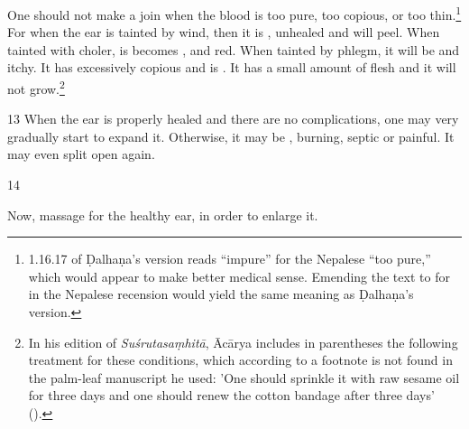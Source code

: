 \begin{translation}
One should not make a join when the blood is too pure, too copious, or too
thin.\footnote{1.16.17 of Ḍalhaṇa's version \citep[79]{vulgate} reads “impure”
    for the Nepalese “too pure,” which would appear to make better medical sense.
    Emending the text to  for  in the Nepalese
    recension would yield the same meaning as Ḍalhaṇa's version.} For when the
    ear is tainted by wind, then it is , unhealed and will peel. When tainted with choler, is becomes
    ,  and red.  When tainted by
    phlegm, it will be  and itchy.  It has excessively
    copious  and is .  It
    has a small amount of  flesh and it will not
    grow.\footnote{In his edition of \emph{Suśrutasaṃhitā}, Ācārya \citep[79 n.
        1]{vulgate} includes in parentheses the following treatment for these
        conditions, which according to a footnote is not found in the palm-leaf
        manuscript he used: 'One should sprinkle it with raw sesame oil for three days
        and one should renew the cotton bandage after three days' ().}
    
\item[13] When the ear is properly healed and there are no complications,  one may
very gradually start to expand it.  Otherwise, it may be ,
burning, septic or painful.  It may even split open again.
    
\item [14]
    
Now, massage for the healthy ear, in order to enlarge it.
     

\end{translation}
